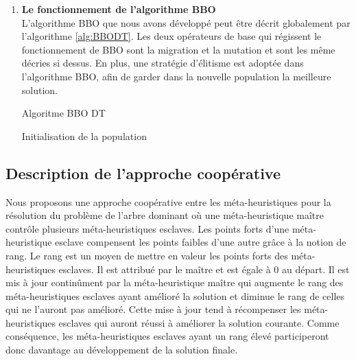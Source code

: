 \begin{enumerate}
\begin{enumerate}[label=\alph*)]
	\end{enumerate}	

	
	\item \textbf{Le fonctionnement de l’algorithme BBO}\\
	L’algorithme BBO que nous avons développé peut être décrit globalement par l’algorithme \ref{alg:BBODT}. Les deux opérateurs de base qui régissent le fonctionnement de BBO sont la migration et la mutation et sont les même décries si dessus. En plus, une stratégie d’élitisme est adoptée dans l’algorithme BBO, afin de garder dans la nouvelle population la meilleure solution.\\

\begin{algorithm}[H]
\label{alg:BBODT}
\caption{Algoritme BBO DT}
\SetAlgoLined
\DontPrintSemicolon
\large

Initialisation de la population \;

\end{algorithm}

	
\end{enumerate}



\subsection{Description de l'approche coopérative}
Nous proposons une approche  coopérative entre les méta-heuristiques pour la résolution du problème de l’arbre dominant où une méta-heuristique maître contrôle plusieurs méta-heuristiques esclaves. Les points forts d'une méta-heuristique esclave compensent les points faibles d'une autre grâce à la notion de rang. Le rang est un moyen de mettre en valeur les points forts des méta-heuristiques esclaves. Il est attribué par le maître et est égale à 0 au départ. Il est mis à jour continûment par la méta-heuristique maître qui augmente le rang des méta-heuristiques esclaves ayant amélioré la solution et diminue le rang de celles qui ne l'auront pas amélioré. Cette mise à jour tend à récompenser les méta-heuristiques esclaves qui auront réussi à améliorer la solution courante. Comme conséquence, les méta-heuristiques esclaves ayant un rang élevé participeront donc davantage au développement de la solution finale.


